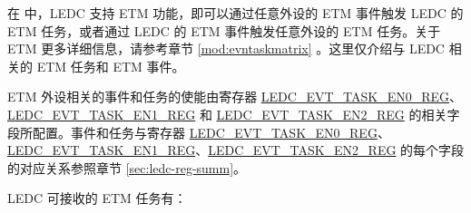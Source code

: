 \documentclass[main\_\_CN.tex]{subfiles}
\begin{document}
在 \chipname{} 中，LEDC 支持 ETM 功能，即可以通过任意外设的 ETM 事件触发 LEDC 的 ETM 任务，或者通过 LEDC 的 ETM 事件触发任意外设的 ETM 任务。关于 ETM 更多详细信息，请参考章节 \ref{mod:evntaskmatrix} 。这里仅介绍与 LEDC 相关的 ETM 任务和 ETM 事件。

ETM 外设相关的事件和任务的使能由寄存器 \hyperref[regdesc:LEDCEVTTASKEN0REG]{LEDC\_EVT\_TASK\_EN0\_REG}、\hyperref[regdesc:LEDCEVTTASKEN1REG]{LEDC\_EVT\_TASK\_EN1\_REG} 和 \hyperref[regdesc:LEDCEVTTASKEN2REG]{LEDC\_EVT\_TASK\_EN2\_REG} 的相关字段所配置。事件和任务与寄存器 \hyperref[regdesc:LEDCEVTTASKEN0REG]{LEDC\_EVT\_TASK\_EN0\_REG}、\hyperref[regdesc:LEDCEVTTASKEN1REG]{LEDC\_EVT\_TASK\_EN1\_REG}、\hyperref[regdesc:LEDCEVTTASKEN2REG]{LEDC\_EVT\_TASK\_EN2\_REG} 的每个字段的对应关系参照章节 \ref{sec:ledc-reg-summ}。

LEDC 可接收的 ETM 任务有：
\end{document}

